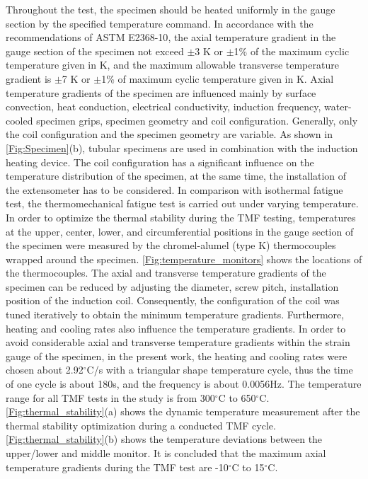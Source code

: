 Throughout the test, the specimen should be heated uniformly in the gauge section by the specified temperature command. In accordance with the recommendations of ASTM E2368-10\cite{ASTME2005}, the axial temperature gradient in the gauge section of the specimen not exceed $\pm$3 K or $\pm$1\% of the
maximum cyclic temperature given in K, and the maximum allowable transverse temperature gradient is $\pm$7 K or $\pm$1\% of maximum cyclic temperature given in K.
Axial temperature gradients of the specimen are influenced mainly by surface convection, heat conduction, electrical conductivity, induction frequency, water-cooled specimen grips, specimen geometry and coil configuration. Generally, only the coil configuration and the specimen geometry are variable. As shown in \ref{Fig:Specimen}(b), tubular specimens are used in combination with the induction heating device. The coil configuration has a significant influence on the temperature distribution of the specimen, at the same time, the installation of the extensometer has to be considered\cite{Hahner2006}.
In comparison with isothermal fatigue test, the thermomechanical fatigue test is carried out under varying temperature.
In order to optimize the thermal stability during the TMF testing, temperatures at the upper, center, lower, and circumferential positions in the gauge section of the specimen were measured by the chromel-alumel (type K) thermocouples wrapped around the specimen. \ref{Fig:temperature_monitors} shows the locations of the thermocouples.
The axial and transverse temperature gradients of the specimen can be reduced by adjusting the diameter, screw pitch, installation position of the induction coil.
Consequently, the configuration of the coil was tuned iteratively to obtain the minimum temperature gradients.
Furthermore, heating and cooling rates also influence the temperature gradients.
In order to avoid considerable axial and transverse temperature gradients within the strain gauge of the specimen, in the present work, the heating and cooling rates were chosen about 2.92$^\circ$C/s with a triangular shape temperature cycle, thus the time of one cycle is about 180s, and the frequency is about 0.0056Hz.
The temperature range for all TMF tests in the study is from 300$^\circ$C to 650$^\circ$C. \ref{Fig:thermal_stability}(a) shows the dynamic temperature measurement after the thermal stability optimization during a conducted TMF cycle. \ref{Fig:thermal_stability}(b) shows the temperature
deviations between the upper/lower and middle monitor. It is concluded that the maximum axial temperature gradients during the TMF test are -10$^\circ$C to 15$^\circ$C.

